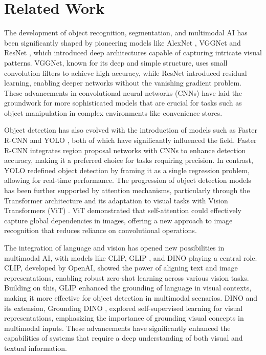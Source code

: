 \section{Related Work}
The development of object recognition, segmentation, and multimodal AI has been significantly shaped by pioneering models like AlexNet \cite{krizhevsky2012imagenet}, VGGNet \cite{simonyan2014very} and ResNet \cite{he2016deep}, which introduced deep architectures capable of capturing intricate visual patterns. VGGNet, known for its deep and simple structure, uses small convolution filters to achieve high accuracy, while ResNet introduced residual learning, enabling deeper networks without the vanishing gradient problem. These advancements in convolutional neural networks (CNNs) have laid the groundwork for more sophisticated models that are crucial for tasks such as object manipulation in complex environments like convenience stores.

Object detection has also evolved with the introduction of models such as Faster R-CNN \cite{ren2015faster} and YOLO \cite{redmon2016you}, both of which have significantly influenced the field. Faster R-CNN integrates region proposal networks with CNNs to enhance detection accuracy, making it a preferred choice for tasks requiring precision. In contrast, YOLO redefined object detection by framing it as a single regression problem, allowing for real-time performance. The progression of object detection models has been further supported by attention mechanisms, particularly through the Transformer architecture and its adaptation to visual tasks with Vision Transformers (ViT) \cite{dosovitskiy2021image}. ViT demonstrated that self-attention could effectively capture global dependencies in images, offering a new approach to image recognition that reduces reliance on convolutional operations.

The integration of language and vision has opened new possibilities in multimodal AI, with models like CLIP, GLIP 
\cite{yu2022glip}, and DINO \cite{caron2021emerging} playing a central role. CLIP, developed by OpenAI, showed the power of aligning text and image representations, enabling robust zero-shot learning across various vision tasks. Building on this, GLIP enhanced the grounding of language in visual contexts, making it more effective for object detection in multimodal scenarios. DINO and its extension, Grounding DINO \cite{li2023grounding}, explored self-supervised learning for visual representations, emphasizing the importance of grounding visual concepts in multimodal inputs. These advancements have significantly enhanced the capabilities of systems that require a deep understanding of both visual and textual information.

